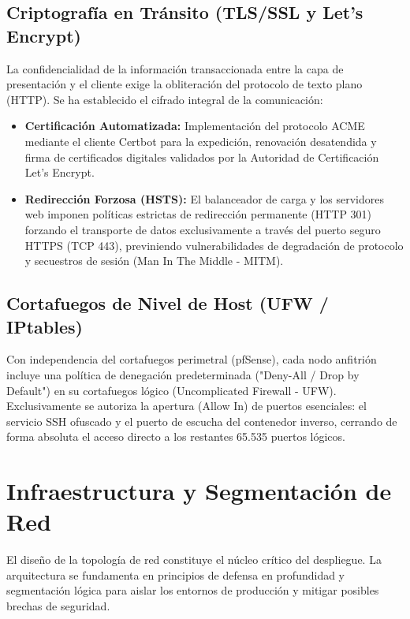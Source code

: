\documentclass[12pt,a4paper]{article}
\begin{document}
\subsection{Criptografía en Tránsito (TLS/SSL y Let's Encrypt)}
La confidencialidad de la información transaccionada entre la capa de presentación y el cliente exige la obliteración del protocolo de texto plano (HTTP). Se ha establecido el cifrado integral de la comunicación:

\begin{itemize}
    \item \textbf{Certificación Automatizada:} Implementación del protocolo ACME mediante el cliente Certbot para la expedición, renovación desatendida y firma de certificados digitales validados por la Autoridad de Certificación Let's Encrypt.
    \item \textbf{Redirección Forzosa (HSTS):} El balanceador de carga y los servidores web imponen políticas estrictas de redirección permanente (HTTP 301) forzando el transporte de datos exclusivamente a través del puerto seguro HTTPS (TCP 443), previniendo vulnerabilidades de degradación de protocolo y secuestros de sesión (Man In The Middle - MITM).
\end{itemize}

\subsection{Cortafuegos de Nivel de Host (UFW / IPtables)}
Con independencia del cortafuegos perimetral (pfSense), cada nodo anfitrión incluye una política de denegación predeterminada ("Deny-All / Drop by Default") en su cortafuegos lógico (Uncomplicated Firewall - UFW). Exclusivamente se autoriza la apertura (Allow In) de puertos esenciales: el servicio SSH ofuscado y el puerto de escucha del contenedor inverso, cerrando de forma absoluta el acceso directo a los restantes 65.535 puertos lógicos.

\section{Infraestructura y Segmentación de Red}
\label{sec:Infraestructura}
El diseño de la topología de red constituye el núcleo crítico del despliegue. La arquitectura se fundamenta en principios de defensa en profundidad y segmentación lógica para aislar los entornos de producción y mitigar posibles brechas de seguridad.
\end{document}
